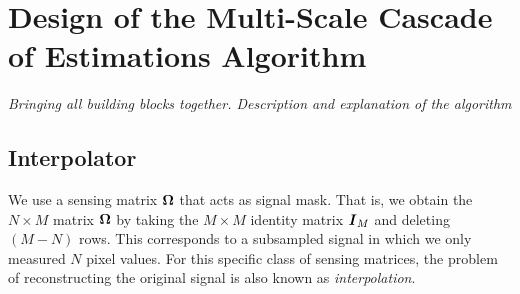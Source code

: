 \chapter{Design of the Multi-Scale Cascade of Estimations Algorithm}
\emph{Bringing all building blocks together. Description and explanation of the algorithm}

\section{Interpolator}
We use a sensing matrix $\boldsymbol\Omega$ that acts as signal mask. That is, we obtain the $N\times M$ matrix $\boldsymbol\Omega$ by taking the $M\times M$ identity matrix $\boldsymbol I_M$ and deleting $(M-N)$ rows. This corresponds to a subsampled signal in which we only measured $N$ pixel values. For this specific class of sensing matrices, the problem of reconstructing the original signal is also known as \emph{interpolation}.

